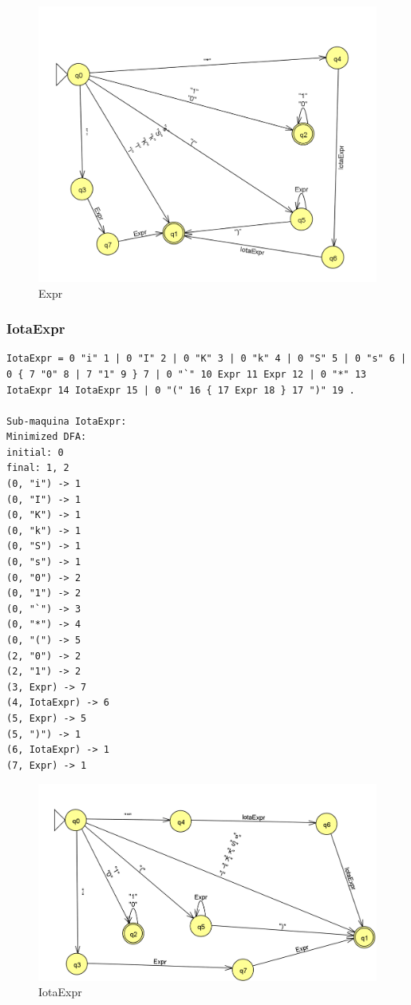 \begin{figure}[H]
\centering
\includegraphics[width=15cm,keepaspectratio]{jflap-automatas/expr.png}
\caption{\label{fig:jflap-expr} Expr}
\end{figure}

\subsubsection{IotaExpr}

\begin{lstlisting}  
IotaExpr = 0 "i" 1 | 0 "I" 2 | 0 "K" 3 | 0 "k" 4 | 0 "S" 5 | 0 "s" 6 | 0 { 7 "0" 8 | 7 "1" 9 } 7 | 0 "`" 10 Expr 11 Expr 12 | 0 "*" 13 IotaExpr 14 IotaExpr 15 | 0 "(" 16 { 17 Expr 18 } 17 ")" 19 .
            
Sub-maquina IotaExpr: 
Minimized DFA: 
initial: 0
final: 1, 2
(0, "i") -> 1
(0, "I") -> 1
(0, "K") -> 1
(0, "k") -> 1
(0, "S") -> 1
(0, "s") -> 1
(0, "0") -> 2
(0, "1") -> 2
(0, "`") -> 3
(0, "*") -> 4
(0, "(") -> 5
(2, "0") -> 2
(2, "1") -> 2
(3, Expr) -> 7
(4, IotaExpr) -> 6
(5, Expr) -> 5
(5, ")") -> 1
(6, IotaExpr) -> 1
(7, Expr) -> 1
\end{lstlisting}

\begin{figure}[H]
\centering
\includegraphics[width=15cm,keepaspectratio]{jflap-automatas/iotaexpr.png}
\caption{\label{fig:jflap-iotaexpr} IotaExpr}
\end{figure}